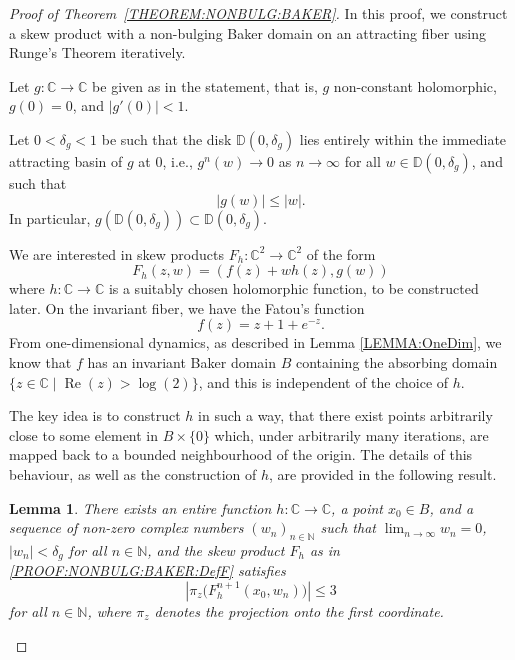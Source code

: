\documentclass[a4paper, 12pt, twoside]{amsart}
\newtheorem{lem}[thm]{Lemma}
\theoremstyle{definition}
\numberwithin{equation}{section}
\renewcommand{\Re}{\operatorname{Re}}
\newcommand{\C}{{\mathbb C}}
\newcommand{\D}{{\mathbb D}}
\newcommand{\N}{{\mathbb N}}
\begin{document}
\begin{proof}[Proof of Theorem~\ref{THEOREM:NONBULG:BAKER}]
	In this proof, we construct a skew product with a non-bulging Baker domain on an attracting fiber using Runge's Theorem iteratively. 

    Let $g : \C \to \C$ be given as in the statement, that is, $g$ non-constant holomorphic, $g(0) = 0$, and $|{g'(0)}| < 1$. 
    
    Let $0 < \delta_g < 1$ be such that the disk $\D(0,\delta_g)$ lies entirely within the immediate attracting basin of $g$ at $0$, i.e., $g^n(w) \to 0$ as $n\to \infty$ for all $w\in \D(0,\delta_g)$, and such that
    \begin{equation}\label{PROOF:NONBULG:BAKER:DefDeltaG}
        |{g(w)}| \leq |{w}|.
    \end{equation}
    In particular, $g(\D(0,\delta_g)) \subset \D(0,\delta_g)$.

    We are interested in skew products $F_h\colon\C^2 \to \C^2$ of the form
    \begin{equation}\label{PROOF:NONBULG:BAKER:DefF}
         F_h(z,w) = (f(z) + wh(z), g(w))
    \end{equation}
    where $h : \C \to \C$ is a suitably chosen holomorphic function, to be constructed later.
    On the invariant fiber, we have the Fatou's function 
    $$
    f(z)=  z + 1 + e^{-z}.
    $$ 
    From one-dimensional dynamics, as described in Lemma \ref{LEMMA:OneDim}, we know that $f$ has an invariant Baker domain $B$ containing the absorbing domain $\{z \in \C\mid\Re(z) > \log(2)\}$, and this is independent of the choice of $h$.

        The key idea is to construct $h$ in such a way, that there exist points arbitrarily close to some element in $B \times \{0\}$ which, under arbitrarily many iterations, are mapped back to a bounded neighbourhood of the origin. The details of this behaviour, as well as the construction of $h$, are provided in the following result.
   

    \begin{lem}\label{PROOF:NONBULG:BAKER:SUBLEMMA}
        There exists an entire function $h : \C \to \C$, a point $x_0 \in B$, and a sequence of non-zero complex numbers $(w_n)_{n \in \N}$ such that $\lim_{n\to\infty}w_n = 0$, $|{w_n}| < \delta_g$ for all $n\in\N$, and the skew product $F_h$ as in \eqref{PROOF:NONBULG:BAKER:DefF} satisfies
        \begin{equation}\label{PROOF:NONBULG:BAKER:SUBLEMMA:EQ1}
            |{\pi_z (F_h^{n+1}(x_0, w_n)})| \leq 3
        \end{equation}
        for all $n\in\N$, where $\pi_z$ denotes the projection onto the first coordinate.
    \end{lem}


\end{proof}
\end{document}
